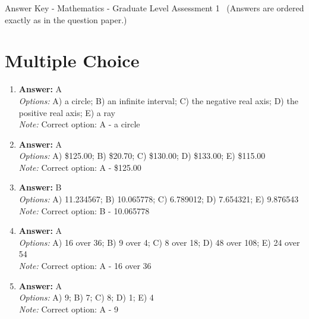 \documentclass[12pt]{article}
\begin{document}
\begin{center}
Answer Key - Mathematics - Graduate Level Assessment 1 \
\small (Answers are ordered exactly as in the question paper.)
\end{center}

\section*{Multiple Choice}
\begin{enumerate}[label=\arabic*.]
\item \textbf{Answer:} A
\\ \textit{Options:} A) a circle; B) an infinite interval; C) the negative real axis; D) the positive real axis; E) a ray
\\ \textit{Note:} Correct option: A - a circle
\item \textbf{Answer:} A
\\ \textit{Options:} A) \$125.00; B) \$20.70; C) \$130.00; D) \$133.00; E) \$115.00
\\ \textit{Note:} Correct option: A - \$125.00
\item \textbf{Answer:} B
\\ \textit{Options:} A) 11.234567; B) 10.065778; C) 6.789012; D) 7.654321; E) 9.876543
\\ \textit{Note:} Correct option: B - 10.065778
\item \textbf{Answer:} A
\\ \textit{Options:} A) 16 over 36; B) 9 over 4; C) 8 over 18; D) 48 over 108; E) 24 over 54
\\ \textit{Note:} Correct option: A - 16 over 36
\item \textbf{Answer:} A
\\ \textit{Options:} A) 9; B) 7; C) 8; D) 1; E) 4
\\ \textit{Note:} Correct option: A - 9
\end{enumerate}
\end{document}
